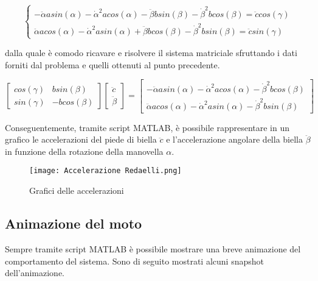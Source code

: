 \documentclass{article}
\begin{document}
\begin{equation}
    \begin{cases}
        -\ddot{\alpha}asin(\alpha) - \dot{\alpha}^2acos(\alpha) - \ddot{\beta}bsin(\beta) - \dot{\beta}^2bcos(\beta) = \ddot{c}cos(\gamma) \\
        \ddot{\alpha}acos(\alpha) - \dot{\alpha}^2asin(\alpha) + \ddot{\beta}bcos(\beta) - \dot{\beta}^2bsin(\beta) = \ddot{c}sin(\gamma)
    \end{cases}
\end{equation}

dalla quale è comodo ricavare e risolvere il sistema matriciale sfruttando i dati forniti dal problema e quelli ottenuti al punto precedente.

\begin{equation}
    \begin{bmatrix}
        cos(\gamma) & bsin(\beta) \\
        sin(\gamma) & -bcos(\beta)
    \end{bmatrix}
    \begin{bmatrix}
        \ddot{c} \\
        \ddot{\beta}
    \end{bmatrix}
    = \begin{bmatrix}
        -\ddot{\alpha}asin(\alpha) - \dot{\alpha}^2acos(\alpha) - \dot{\beta}^2bcos(\beta) \\
        \ddot{\alpha}acos(\alpha) - \dot{\alpha}^2asin(\alpha) - \dot{\beta}^2bsin(\beta)
    \end{bmatrix}
\end{equation}

Conseguentemente, tramite script MATLAB, è possibile rappresentare in un grafico le accelerazioni del piede di biella $\ddot{c}$ e l'accelerazione angolare della biella $\ddot{\beta}$ in funzione della rotazione della manovella $\alpha$.

\begin{figure}[h!]
    \centering
    \texttt{[image: Accelerazione Redaelli.png]}
    \caption{Grafici delle accelerazioni}
    \label{fig:5}
\end{figure}

\bigskip
\bigskip
\bigskip

\subsection{Animazione del moto}
Sempre tramite script MATLAB è possibile mostrare una breve animazione del comportamento del sistema. Sono di seguito mostrati alcuni snapshot dell'animazione.
\end{document}
